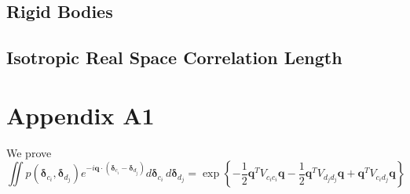 \documentclass{article}
\begin{document}
\subsection{Rigid Bodies}


\subsection{Isotropic Real Space Correlation Length}




\section{Appendix A1}
We prove
\begin{equation}
\iint p( \boldsymbol{\delta}_{c_i},  \boldsymbol{\delta}_{d_j} )
e^{-i \mathbf{q} \cdot ( \boldsymbol{\delta}_{c_i}  - \boldsymbol{\delta}_{d_j})} 
d \boldsymbol{\delta}_{c_i}  \, d \boldsymbol{\delta}_{d_j}
=
\exp \left\{
- \frac{1}{2} \mathbf{q}^T V_{c_i c_i} \mathbf{q}
- \frac{1}{2} \mathbf{q}^T V_{d_j d_j} \mathbf{q}
+ \mathbf{q}^T V_{c_i d_j} \mathbf{q}
\right\}
\label{eq:disorder_term}
\end{equation}






\end{document}
